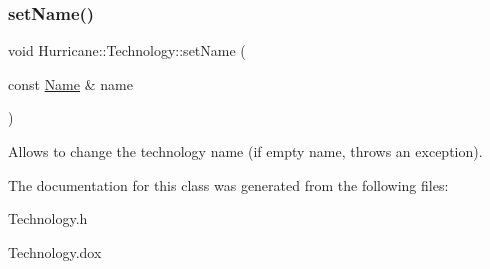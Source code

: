 \subsubsection{\texorpdfstring{set\+Name()}{setName()}}
{\footnotesize\ttfamily void Hurricane\+::\+Technology\+::set\+Name (\begin{DoxyParamCaption}\item[{const \mbox{\hyperlink{classHurricane_1_1Name}{Name}} \&}]{name }\end{DoxyParamCaption})}

Allows to change the technology name (if empty name, throws an exception). 

The documentation for this class was generated from the following files\+:\begin{DoxyCompactItemize}
\item 
Technology.\+h\item 
Technology.\+dox\end{DoxyCompactItemize}
